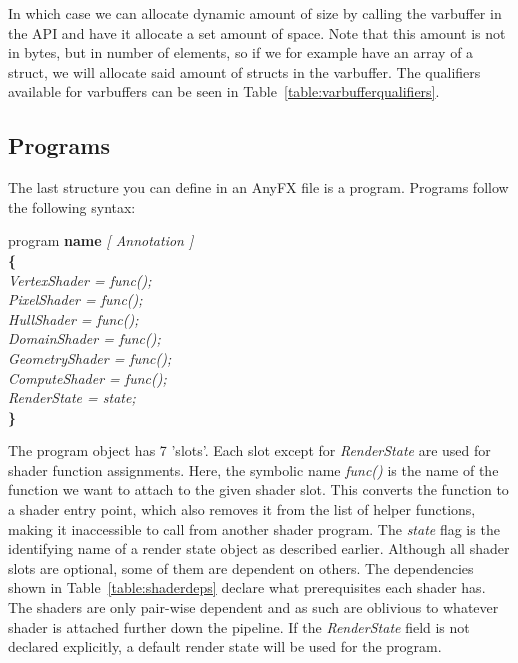 \documentclass{article}
\newcommand{\SyntaxBox}[1]
{	
	\begin{center}
	\colorbox{orange!60}
	{
		\begin{minipage}{\linewidth}
		\hfill
		\begin{tabbing}
		#1
		\end{tabbing}
		\end{minipage}
	}
	\end{center}
}
\begin{document}
In which case we can allocate dynamic amount of size by calling the varbuffer in the API and have it allocate a set amount of space. Note that this amount is not in bytes, but in number of elements, so if we for example have an array of a struct, we will allocate said amount of structs in the varbuffer. The qualifiers available for varbuffers can be seen in Table~\ref{table:varbufferqualifiers}.

\begin{table}[hp]
\centering
\caption{Varbuffer qualifiers}
\label{table:varbufferqualifiers}
\end{table}

\subsection{Programs}
The last structure you can define in an AnyFX file is a program. Programs follow the following syntax:

\SyntaxBox
{
	program \textbf{name} \textit{ [ Annotation ] } \\
	\textbf{\{} \= \\
	\>	\textit{VertexShader = func();} \\
	\>	\textit{PixelShader = func();} \\ 
	\>	\textit{HullShader = func();} \\ 
	\>	\textit{DomainShader = func();} \\ 
	\>	\textit{GeometryShader = func();} \\
	\>	\textit{ComputeShader = func();} \\
	\>	\textit{RenderState = state;} \\
	\textbf{\}}
}

The program object has 7 'slots'. Each slot except for \textit{RenderState} are used for shader function assignments. Here, the symbolic name \textit{func()} is the name of the function we want to attach to the given shader slot. This converts the function to a shader entry point, which also removes it from the list of helper functions, making it inaccessible to call from another shader program. The \textit{state} flag is the identifying name of a render state object as described earlier. Although all shader slots are optional, some of them are dependent on others. The dependencies shown in Table~\ref{table:shaderdeps} declare what prerequisites each shader has. The shaders are only pair-wise dependent and as such are oblivious to whatever shader is attached further down the pipeline. If the \textit{RenderState} field is not declared explicitly, a default render state will be used for the program.
\end{document}
